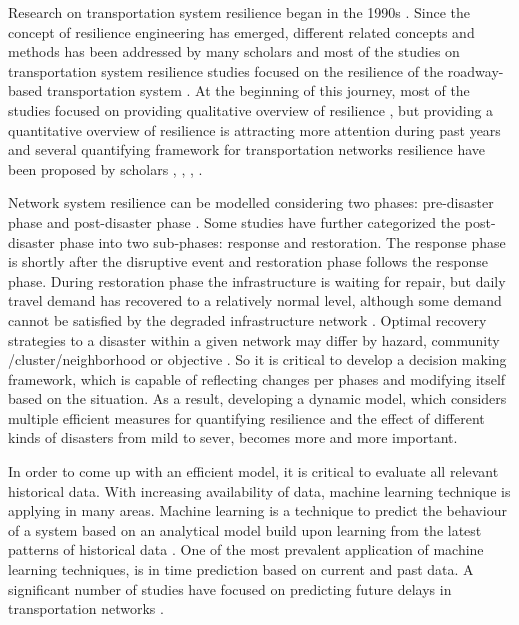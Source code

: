 \documentclass[11pt,twoside]{article}
\numberwithin{equation}{section}
\newcommand{\?}{\stackrel{?}{=}}
\begin{document}
Research on transportation system resilience began in the 1990s \citep{ahmed2020resilience}. Since the concept of
resilience engineering has emerged, different related concepts and methods has been addressed by many scholars and most
of the studies on transportation system resilience studies focused on the resilience of the roadway-based transportation
system \citep{ahmed2020resilience}. At the beginning of this journey, most of the studies focused on providing
qualitative overview of resilience \citep{baroud2014inherent}, \citep{bhatia2015network} but providing a quantitative
overview of resilience is attracting more attention during past years and several quantifying framework for
transportation networks resilience have been proposed by scholars \citep{adjetey-bahun2014simulationbased},
\citep{cavallaro2014assessment}, \citep{bhatia2015network}, \citep{donovan2017empirically}.

Network system resilience can be modelled considering two phases: pre-disaster phase and post-disaster phase
\citep{ahmed2020resilience}. Some studies have further categorized the post-disaster phase into two sub-phases: response
and restoration. The response phase is shortly after the disruptive event and restoration phase follows the response
phase. During restoration phase the infrastructure is waiting for repair, but daily travel demand has recovered to a
relatively normal level, although some demand cannot be satisfied by the degraded infrastructure network
\citep{tingting2020transportation}. Optimal recovery strategies to a disaster within a given network may differ by
hazard, community /cluster/neighborhood or objective \citep{bhatia2015network}. So it is critical to develop a decision
making framework, which is capable of reflecting changes per phases and modifying itself based on the situation. As a
result, developing a dynamic model, which considers multiple efficient measures for quantifying resilience and the
effect of different kinds of disasters from mild to sever, becomes more and more important.

In order to come up with an efficient model, it is critical to evaluate all relevant historical data. With increasing
availability of data, machine learning technique is applying in many areas.  Machine learning is a technique to predict
the behaviour of a system based on an analytical model build upon learning from the latest patterns of historical data
\citep{tizghadam2019machine}.  One of the most prevalent application of machine learning techniques, is in time
prediction based on current and past data. A significant number of studies have focused on predicting future delays in
transportation networks \citep{chandramouleeswaran2018machine, takeichi2017prediction, choi2016prediction}.
\end{document}
